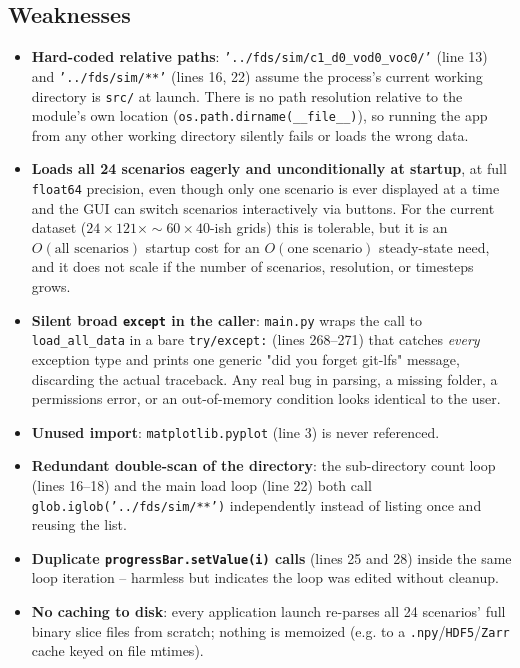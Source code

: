 \documentclass[11pt,a4paper]{report}
\begin{document}
\subsection{Weaknesses}
\begin{itemize}[nosep]
\item \textbf{Hard-coded relative paths}: \texttt{'../fds/sim/c1\_d0\_vod0\_voc0/'} (line 13) and
\texttt{'../fds/sim/**'} (lines 16, 22) assume the process's current working directory is
\texttt{src/} at launch. There is no path resolution relative to the module's own location
(\texttt{os.path.dirname(\_\_file\_\_)}), so running the app from any other working directory silently
fails or loads the wrong data.
\item \textbf{Loads all 24 scenarios eagerly and unconditionally at startup}, at full \texttt{float64}
precision, even though only one scenario is ever displayed at a time and the GUI can switch scenarios
interactively via buttons. For the current dataset ($24 \times 121 \times \sim\!60\times\!40$-ish
grids) this is tolerable, but it is an $O(\text{all scenarios})$ startup cost for an
$O(\text{one scenario})$ steady-state need, and it does not scale if the number of scenarios,
resolution, or timesteps grows.
\item \textbf{Silent broad \texttt{except} in the caller}: \texttt{main.py} wraps the call to
\texttt{load\_all\_data} in a bare \texttt{try/except:} (lines 268--271) that catches
\emph{every} exception type and prints one generic "did you forget git-lfs" message, discarding the
actual traceback. Any real bug in parsing, a missing folder, a permissions error, or an out-of-memory
condition looks identical to the user.
\item \textbf{Unused import}: \texttt{matplotlib.pyplot} (line 3) is never referenced.
\item \textbf{Redundant double-scan of the directory}: the sub-directory count loop (lines 16--18) and
the main load loop (line 22) both call \texttt{glob.iglob('../fds/sim/**')} independently instead of
listing once and reusing the list.
\item \textbf{Duplicate \texttt{progressBar.setValue(i)} calls} (lines 25 and 28) inside the same loop
iteration -- harmless but indicates the loop was edited without cleanup.
\item \textbf{No caching to disk}: every application launch re-parses all 24 scenarios' full binary
slice files from scratch; nothing is memoized (e.g. to a \texttt{.npy}/\texttt{HDF5}/\texttt{Zarr}
cache keyed on file mtimes).
\end{itemize}
\end{document}
